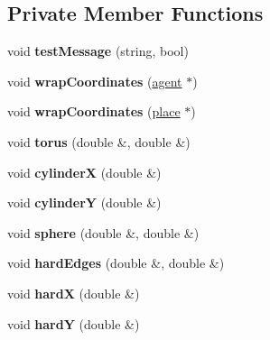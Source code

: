 \subsection*{Private Member Functions}
\begin{DoxyCompactItemize}
\item 
\mbox{\label{classsearchGrid_a16674ff1034191fca07034a321ab58ce}} 
void {\bfseries test\+Message} (string, bool)
\item 
\mbox{\label{classsearchGrid_a0bd630ee87181f0d9dcc19105cf1155c}} 
void {\bfseries wrap\+Coordinates} (\mbox{\hyperlink{classagent}{agent}} $\ast$)
\item 
\mbox{\label{classsearchGrid_a9a62217ee00a8eb3490f6e504ce4d797}} 
void {\bfseries wrap\+Coordinates} (\mbox{\hyperlink{classplace}{place}} $\ast$)
\item 
\mbox{\label{classsearchGrid_a0d93e1c5a49ed0bb06a6a2bfdd0882f9}} 
void {\bfseries torus} (double \&, double \&)
\item 
\mbox{\label{classsearchGrid_ab6311643aef00a7c2324c7508e5fcbf4}} 
void {\bfseries cylinderX} (double \&)
\item 
\mbox{\label{classsearchGrid_a528af7734ebf54aa8a2378f6871c029a}} 
void {\bfseries cylinderY} (double \&)
\item 
\mbox{\label{classsearchGrid_a80caf18fc9f6d6a47d140c82a67e9154}} 
void {\bfseries sphere} (double \&, double \&)
\item 
\mbox{\label{classsearchGrid_a2707bb2fb7ca5b386f9f437b7a2a1956}} 
void {\bfseries hard\+Edges} (double \&, double \&)
\item 
\mbox{\label{classsearchGrid_ae890b7d65535b733415110256a643d87}} 
void {\bfseries hardX} (double \&)
\item 
\mbox{\label{classsearchGrid_a091a3f2ed69bceb26ab1d2b95b4bd222}} 
void {\bfseries hardY} (double \&)
\end{DoxyCompactItemize}
